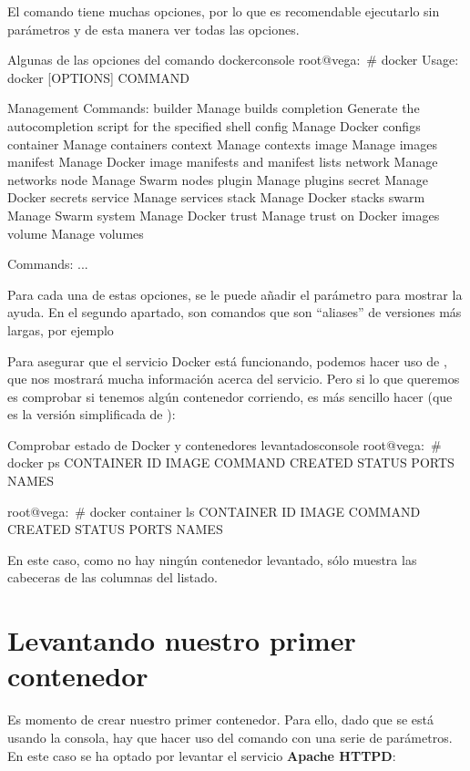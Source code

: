 
El comando  tiene muchas opciones, por lo que es recomendable ejecutarlo sin parámetros y de esta manera ver todas las opciones.

\begin{mycode}{Algunas de las opciones del comando docker}{console}{}
root@vega:~# docker
Usage:  docker [OPTIONS] COMMAND

Management Commands:
builder     Manage builds
completion  Generate the autocompletion script for the specified shell
config      Manage Docker configs
container   Manage containers
context     Manage contexts
image       Manage images
manifest    Manage Docker image manifests and manifest lists
network     Manage networks
node        Manage Swarm nodes
plugin      Manage plugins
secret      Manage Docker secrets
service     Manage services
stack       Manage Docker stacks
swarm       Manage Swarm
system      Manage Docker
trust       Manage trust on Docker images
volume      Manage volumes

Commands:
...
\end{mycode}

Para cada una de estas opciones, se le puede añadir el parámetro  para mostrar la ayuda. En el segundo apartado, son comandos que son “aliases” de versiones más largas, por ejemplo

Para asegurar que el servicio Docker está funcionando, podemos hacer uso de , que nos mostrará mucha información acerca del servicio. Pero si lo que queremos es comprobar si tenemos algún contenedor corriendo, es más sencillo hacer  (que es la versión simplificada de  ):

\begin{mycode}{Comprobar estado de Docker y contenedores levantados}{console}{}
root@vega:~# docker ps
CONTAINER ID   IMAGE     COMMAND   CREATED   STATUS    PORTS     NAMES

root@vega:~# docker container ls
CONTAINER ID   IMAGE     COMMAND   CREATED   STATUS    PORTS     NAMES
\end{mycode}

En este caso, como no hay ningún contenedor levantado, sólo muestra las cabeceras de las columnas del listado.

\section{Levantando nuestro primer contenedor}
Es momento de crear nuestro primer contenedor. Para ello, dado que se está usando la consola, hay que hacer uso del comando  con una serie de parámetros. En este caso se ha optado por levantar el servicio \textbf{Apache HTTPD}:

